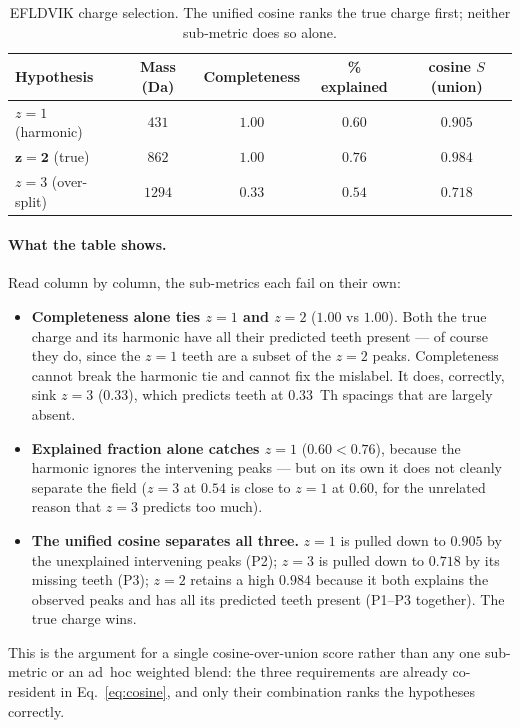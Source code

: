 \documentclass[11pt]{article}
\begin{document}
\begin{table}[h]
\centering
\renewcommand{\arraystretch}{1.25}
\begin{tabular}{@{}l c c c c@{}}
\toprule
\textbf{Hypothesis} & \textbf{Mass (Da)} & \textbf{Completeness} & \textbf{\% explained} & \textbf{cosine $S$ (union)} \\
\midrule
$z=1$ (harmonic)      & $431$  & $1.00$ & $0.60$ & $0.905$ \\
$\mathbf{z=2}$ (true) & $862$  & $1.00$ & $0.76$ & $\mathbf{0.984}$ \\
$z=3$ (over-split)    & $1294$ & $0.33$ & $0.54$ & $0.718$ \\
\bottomrule
\end{tabular}
\caption{EFLDVIK charge selection. The unified cosine ranks the true charge first;
neither sub-metric does so alone.}
\label{tab:validation}
\end{table}

\paragraph{What the table shows.}
Read column by column, the sub-metrics each fail on their own:
\begin{itemize}[leftmargin=1.4em]
  \item \textbf{Completeness alone ties $z{=}1$ and $z{=}2$} ($1.00$ vs $1.00$). Both
  the true charge and its harmonic have all their predicted teeth present --- of
  course they do, since the $z{=}1$ teeth are a subset of the $z{=}2$ peaks.
  Completeness cannot break the harmonic tie and cannot fix the mislabel. It does,
  correctly, sink $z{=}3$ ($0.33$), which predicts teeth at $0.33$~Th spacings that
  are largely absent.
  \item \textbf{Explained fraction alone catches $z{=}1$} ($0.60 < 0.76$), because
  the harmonic ignores the intervening peaks --- but on its own it does not cleanly
  separate the field ($z{=}3$ at $0.54$ is close to $z{=}1$ at $0.60$, for the
  unrelated reason that $z{=}3$ predicts too much).
  \item \textbf{The unified cosine separates all three.} $z{=}1$ is pulled down to
  $0.905$ by the unexplained intervening peaks (P2); $z{=}3$ is pulled down to
  $0.718$ by its missing teeth (P3); $z{=}2$ retains a high $0.984$ because it both
  explains the observed peaks and has all its predicted teeth present (P1--P3
  together). The true charge wins.
\end{itemize}
This is the argument for a single cosine-over-union score rather than any one
sub-metric or an ad~hoc weighted blend: the three requirements are already
co-resident in Eq.~\eqref{eq:cosine}, and only their combination ranks the
hypotheses correctly.
\end{document}
